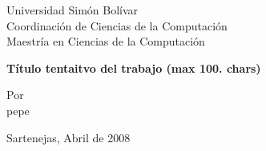 \documentclass{article}
\begin{document}

\thispagestyle{empty}

\textsf{
Universidad Simón Bolívar \\
Coordinación de Ciencias de la Computación \\
Maestría en Ciencias de la Computación \\
}

\begin{center}

{\large \bf \textsf{Título tentaitvo del trabajo (max 100. chars)}}

\end{center}

\vspace{5.0cm}

\textsf{
Por \\
pepe \\
}

\vspace{\fill}

\vspace{\fill}

\vspace{1.0cm}
\textsf{Sartenejas, Abril de 2008}
\end{document}
